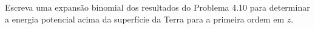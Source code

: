 Escreva uma expansão binomial dos resultados do Problema 4.10 para determinar a energia potencial acima da superfície da Terra para a primeira ordem em $z$.

